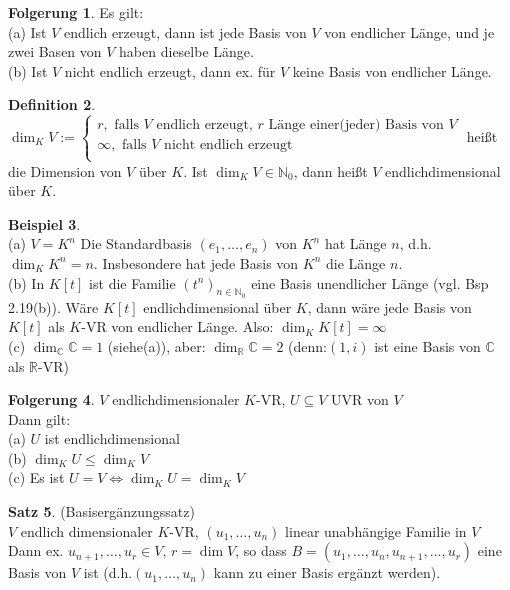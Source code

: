 \documentclass[10pt,a4paper,numbers=endperiod]{scrartcl}
\theoremstyle{definition}
\newtheorem{satz}{Satz}[section]
\newtheorem{defi}[satz]{Definition}
\newtheorem{bsp}[satz]{Beispiel}
\newtheorem{folg}[satz]{Folgerung}
\begin{document}
\begin{folg}
	Es gilt:\\
	(a) Ist $V$ endlich erzeugt, dann ist jede Basis von $V$ von endlicher Länge, und je zwei Basen von $V$ haben dieselbe Länge.\\
	(b) Ist $V$ nicht endlich erzeugt, dann ex. für $V$ keine Basis von endlicher Länge.
\end{folg}

\begin{defi}
	$ $\\
	$\dim_KV := \begin{cases}
	r, \text{ falls } V \text{ endlich erzeugt, } r \text{ Länge einer(jeder) Basis von }V\\
	\infty, \text{ falls } V \text{ nicht endlich erzeugt}\\
	\end{cases}$
	heißt die Dimension von $V$ über $K$. Ist $\dim_KV \in \mathbb{N}_0$, dann heißt $V$ endlichdimensional über $K$. 
\end{defi}

\begin{bsp}
	$ $ \\
	(a) $V=K^n$ Die Standardbasis $(e_1,\ldots,e_n)$ von $K^n$ hat Länge $n$, d.h. $\dim_KK^n = n$. Insbesondere hat jede Basis von $K^n$ die Länge $n$.\\
	(b) In $K[t]$ ist die Familie $(t^n)_{n\in \mathbb{N}_0}$ eine Basis unendlicher Länge (vgl. Bsp 2.19(b)). Wäre $K[t]$ endlichdimensional über $K$, dann wäre jede Basis von $K[t]$ als $K$-VR von endlicher Länge. Also: $\dim_KK[t] = \infty$\\
	(c) $\dim_{\mathbb{C}}\mathbb{C}=1$ (siehe(a)), aber: $\dim_{\mathbb{R}}\mathbb{C}= 2$ (denn:$(1,i)$ ist eine Basis von $\mathbb{C}$ als $\mathbb{R}$-VR)
\end{bsp}

\begin{folg}
	$V$ endlichdimensionaler $K$-VR, $U \subseteq V$ UVR von $V$\\
	Dann gilt:\\
	(a) $U$ ist endlichdimensional\\
	(b) $\dim_KU \leq \dim_KV$\\
	(c) Es ist $U=V \Leftrightarrow \dim_KU=\dim_KV$
\end{folg}

\begin{satz}
	(Basisergänzungssatz)\\
	$V$ endlich dimensionaler $K$-VR, $(u_1,\ldots,u_n)$ linear unabhängige Familie in $V$\\
	Dann ex. $u_{n+1},\ldots,u_r \in V$, $r= \dim V$, so dass $B=(u_1,\ldots,u_n,u_{n+1},\ldots,u_r)$ eine Basis von $V$ ist (d.h.$(u_1,\ldots,u_n)$ kann zu einer Basis ergänzt werden).
\end{satz}
\end{document}

